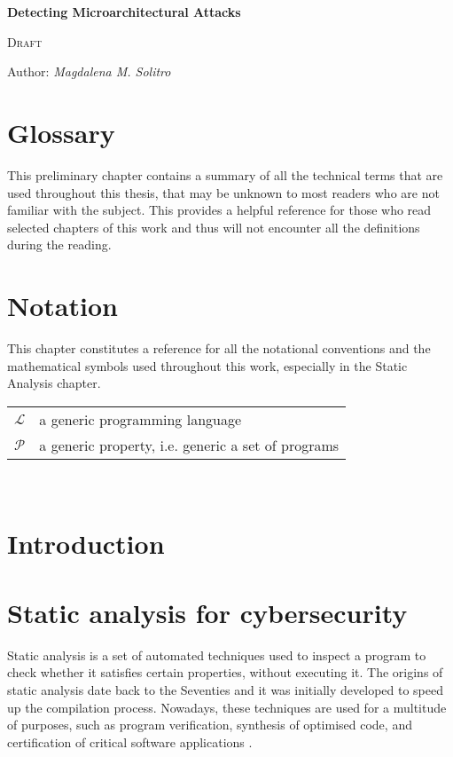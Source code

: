 \documentclass[12pt,a4paper]{book}
\theoremstyle{definition}
\begin{document}
	
	\begin{titlepage}
		\begin{center}
			\vspace*{1cm}
			
			\Huge
			\textbf{\Huge Detecting Microarchitectural Attacks}
			
			\vspace{0.3cm}
			\LARGE \textsc{Draft}
			
			\vspace{1.5cm}
			
			\large Author: \textit{Magdalena M. Solitro}
			
			\vfill
		\end{center}
	\end{titlepage}
	
	\tableofcontents
	
	\mainmatter
	
	\chapter*{Glossary}
	This preliminary chapter contains a summary of all the technical terms that are used throughout this thesis, that may be unknown to most readers who are not familiar with the subject. This provides a helpful reference for those who read selected chapters of this work and thus will not encounter all the definitions during the reading.
	
	\chapter*{Notation}
	This chapter constitutes a reference for all the notational conventions and the mathematical symbols used throughout this work, especially in the Static Analysis chapter. 
	\renewcommand{\arraystretch}{2.0}
	\setlength{\tabcolsep}{25pt}
	\begin{tabular}{l l}
		$\mathcal{L}$ & a generic programming language \\
		$\mathcal{P}$ & a generic property, i.e. generic a set of programs
	\end{tabular}\\
	
	\chapter{Introduction}\label{chapter:intro}
	
	\chapter{Static analysis for cybersecurity}\label{chapter:static_analysis}
	Static analysis is a set of automated techniques used to inspect a program to check whether it satisfies certain properties, without executing it. The origins of static analysis date back to the Seventies and it was initially developed to speed up the compilation process. Nowadays, these techniques are used for a multitude of purposes, such as program verification, synthesis of optimised code, and certification of critical software applications \cite{Rival2020}. 
	
\end{document}
